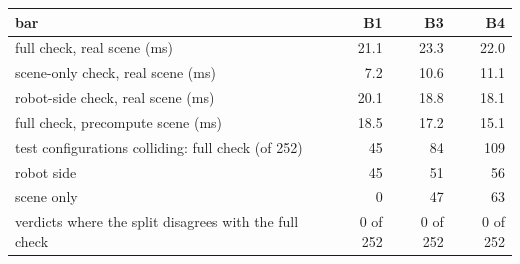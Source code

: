 \begin{tabular}{@{}>{\raggedright\arraybackslash}p{7.4cm} rrr@{}}
\toprule
bar & B1 & B3 & B4 \\
\midrule
full check, real scene (ms) & 21.1 & 23.3 & 22.0 \\
scene-only check, real scene (ms) & 7.2 & 10.6 & 11.1 \\
robot-side check, real scene (ms) & 20.1 & 18.8 & 18.1 \\
full check, precompute scene (ms) & 18.5 & 17.2 & 15.1 \\
\midrule
test configurations colliding: full check (of 252) & 45 & 84 & 109 \\
\quad robot side & 45 & 51 & 56 \\
\quad scene only & 0 & 47 & 63 \\
verdicts where the split disagrees with the full check & 0 of 252 & 0 of 252 & 0 of 252 \\
\bottomrule
\end{tabular}
